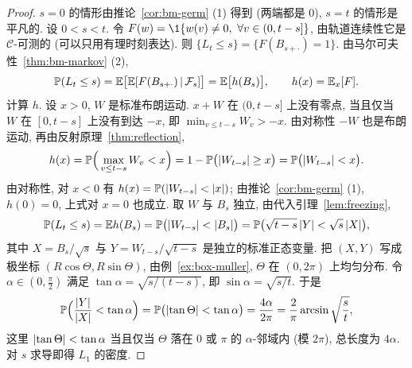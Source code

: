 \begin{proof}
$s=0$ 的情形由推论~\ref{cor:bm-germ} (1) 得到 (两端都是 $0$), $s=t$ 的情形是平凡的. 设 $0<s<t$. 令 $F(w)=\1\{w(v)\ne0,\ \forall v\in(0,t-s]\}$, 由轨道连续性它是 $\mathcal{C}$-可测的 (可以只用有理时刻表达). 则 $\{L_t\le s\}=\{F(B_{s+\cdot})=1\}$. 由马尔可夫性~\ref{thm:bm-markov} (2),
\[
\mathbb{P}(L_t\le s)=\mathbb{E}\big[\mathbb{E}[F(B_{s+\cdot})\,|\,\mathcal{F}_s]\big]=\mathbb{E}\big[h(B_s)\big],\qquad h(x)=\mathbb{E}_x[F].
\]
计算 $h$. 设 $x>0$, $W$ 是标准布朗运动. $x+W$ 在 $(0,t-s]$ 上没有零点, 当且仅当 $W$ 在 $[0,t-s]$ 上没有到达 $-x$, 即 $\min_{v\le t-s}W_v>-x$. 由对称性 $-W$ 也是布朗运动, 再由反射原理~\ref{thm:reflection},
\[
h(x)=\mathbb{P}\Big(\max_{v\le t-s}W_v<x\Big)=1-\mathbb{P}\big(\lvert W_{t-s}\rvert\ge x\big)=\mathbb{P}\big(\lvert W_{t-s}\rvert<x\big).
\]
由对称性, 对 $x<0$ 有 $h(x)=\mathbb{P}(\lvert W_{t-s}\rvert<\lvert x\rvert)$; 由推论~\ref{cor:bm-germ} (1), $h(0)=0$, 上式对 $x=0$ 也成立. 取 $W$ 与 $B_s$ 独立, 由代入引理~\ref{lem:freezing},
\[
\mathbb{P}(L_t\le s)=\mathbb{E} h(B_s)=\mathbb{P}\big(\lvert W_{t-s}\rvert<\lvert B_s\rvert\big)=\mathbb{P}\big(\sqrt{t-s}\,\lvert Y\rvert<\sqrt{s}\,\lvert X\rvert\big),
\]
其中 $X=B_s/\sqrt{s}$ 与 $Y=W_{t-s}/\sqrt{t-s}$ 是独立的标准正态变量. 把 $(X,Y)$ 写成极坐标 $(R\cos\Theta,R\sin\Theta)$, 由例~\ref{ex:box-muller}, $\Theta$ 在 $(0,2\pi)$ 上均匀分布. 令 $\alpha\in(0,\frac{\pi}{2})$ 满足 $\tan\alpha=\sqrt{s/(t-s)}$, 即 $\sin\alpha=\sqrt{s/t}$. 于是
\[
\mathbb{P}\Big(\frac{\lvert Y\rvert}{\lvert X\rvert}<\tan\alpha\Big)=\mathbb{P}\big(\lvert\tan\Theta\rvert<\tan\alpha\big)=\frac{4\alpha}{2\pi}=\frac{2}{\pi}\arcsin\sqrt{\frac{s}{t}},
\]
这里 $\lvert\tan\Theta\rvert<\tan\alpha$ 当且仅当 $\Theta$ 落在 $0$ 或 $\pi$ 的 $\alpha$-邻域内 (模 $2\pi$), 总长度为 $4\alpha$. 对 $s$ 求导即得 $L_1$ 的密度.
\end{proof}


